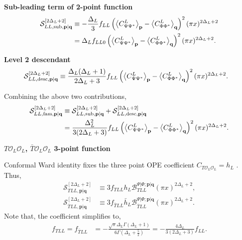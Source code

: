 \documentclass[11pt]{article}
\newcommand{\mO}{\mathcal{O}}
\newcommand{\nn}{\nonumber}
\newcommand{\lb}{\left(}
\newcommand{\rb}{\right)}
\begin{document}
\textbf{Sub-leading term of 2-point function}
\begin{align}
    \mathcal S_{LL,{\rm sub},\mathbf p|\mathbf q}^{[2\Delta_L+2]}
    &\equiv
    -\frac{\Delta_L}{3}
    f_{LL}
    \left(
    \left\langle C_{\Psi\Psi^*}^{L}\right\rangle_{\mathbf p}
    -
    \left\langle C_{\Phi\Phi^*}^{L}\right\rangle_{\mathbf q}
    \right)^2
    (\pi x)^{2\Delta_L+2}
    \nn\\
    &=
    \Delta_L f_{LL0}
    \left(
    \left\langle C_{\Psi\Psi^*}^{L}\right\rangle_{\mathbf p}
    -
    \left\langle C_{\Phi\Phi^*}^{L}\right\rangle_{\mathbf q}
    \right)^2
    (\pi x)^{2\Delta_L+2}.
\end{align}

\textbf{Level 2 descendant}
\begin{align}
    \mathcal S_{LL,{\rm desc},\mathbf p|\mathbf q}^{[2\Delta_L+2]}
    &\equiv
    \frac{\Delta_L(\Delta_L+1)}
    {2\Delta_L+3}
    f_{LL}
    \left(
    \left\langle C_{\Psi\Psi^*}^{L}\right\rangle_{\mathbf p}
    -
    \left\langle C_{\Phi\Phi^*}^{L}\right\rangle_{\mathbf q}
    \right)^2
    (\pi x)^{2\Delta_L+2}.
\end{align}

Combining the above two contributions,
\begin{align}
    \mathcal S_{LL,{\rm fam},\mathbf p|\mathbf q}^{[2\Delta_L+2]}
    &\equiv
    \mathcal S_{LL,{\rm sub},\mathbf p|\mathbf q}^{[2\Delta_L+2]}
    +
    \mathcal S_{LL,{\rm desc},\mathbf p|\mathbf q}^{[2\Delta_L+2]}
    \nn\\
    &=
    \frac{\Delta_L^2}
    {3(2\Delta_L+3)}
    f_{LL}
    \left(
    \left\langle C_{\Psi\Psi^*}^{L}\right\rangle_{\mathbf p}
    -
    \left\langle C_{\Phi\Phi^*}^{L}\right\rangle_{\mathbf q}
    \right)^2
    (\pi x)^{2\Delta_L+2}.
\end{align}

\textbf{$T\mO_L\mO_L$, $\bar T\mO_L\mO_L$ 3-point function}

Conformal Ward identity fixes the three point OPE coefficient
$C_{T\mO_L\mO_L}=h_L$ \cite{yellowbook}. Thus,
\begin{align}
    \mathcal S_{TLL,\mathbf p|\mathbf q}^{[2\Delta_L+2]}
    &\equiv
    3
    f_{TLL}h_L
    \mathcal B_{TLL}^{\Psi|\Phi;\mathbf p|\mathbf q}
    (\pi x)^{2\Delta_L+2},
    \\
    \mathcal S_{\bar TLL,\mathbf p|\mathbf q}^{[2\Delta_L+2]}
    &\equiv
    3
    f_{\bar TLL}\bar h_L
    \mathcal B_{\bar TLL}^{\Psi|\Phi;\mathbf p|\mathbf q}
    (\pi x)^{2\Delta_L+2}.
\end{align}
Note that, the coefficient simplifies to,
\begin{align}
    f_{TLL}=f_{\bar TLL}
    &=
    -\frac{\sqrt{\pi}\Delta_L\Gamma(\Delta_L+1)}
    {6\Gamma\lb\Delta_L+\frac52\rb}
    =
    -\frac{4\Delta_L}
    {3(2\Delta_L+3)}f_{LL}.
\end{align}
\end{document}
